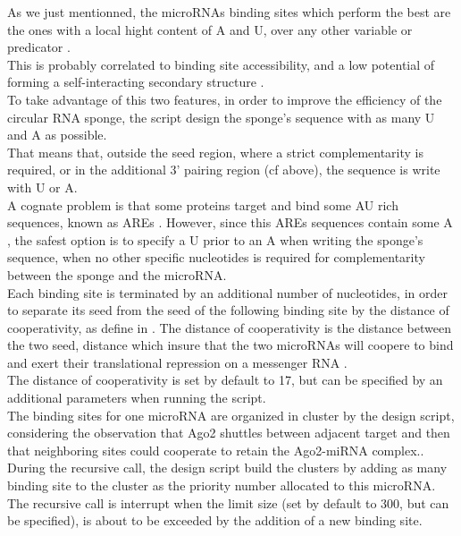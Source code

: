 \documentclass[a4paper,12pt]{report}
\begin{document}
As we just mentionned, the microRNAs binding sites which perform the best are the ones with a local hight content of A and U, over any other variable or predicator \cite{Urich}. \\
This is probably correlated to binding site accessibility, and a low potential of forming a self-interacting secondary structure \cite{Urich}. \\
To take advantage of this two features, in order to improve the efficiency of the circular RNA sponge, the script design the sponge's sequence with as many U and A as possible. \\ 
That means that, outside the seed region, where a strict complementarity is required, or in the additional 3' pairing region (cf above), the sequence is write with U or A. \\ A cognate problem is that some proteins target and bind some AU rich sequences, known as AREs \cite{AREs}. However, since this AREs sequences contain some A \cite{AREs}, the safest option is to specify a U prior to an A when writing the sponge's sequence, when no other specific nucleotides is required for complementarity between the sponge and the microRNA. \\

Each binding site is terminated by an additional number of nucleotides, in order to separate its seed from the seed of the following binding site by the distance of cooperativity, as define in \cite{coop}. The distance of cooperativity is the distance between the two seed, distance which insure that the two microRNAs will coopere to bind and exert their translational repression on a messenger RNA \cite{coop}.\\
The distance of cooperativity is set by default to 17, but can be specified by an additional parameters when running the script.\\

The binding sites for one microRNA are organized in cluster by the design script, considering the observation that Ago2 shuttles between adjacent target and then that neighboring sites could cooperate to retain the Ago2-miRNA complex.\cite{cluster}. \\

During the recursive call, the design script build the clusters by adding as many binding site to the cluster as the priority number allocated to this microRNA. The recursive call is interrupt when the limit size (set by default to 300, but can be specified), is about to be exceeded by the addition of a new binding site.\\
\end{document}
